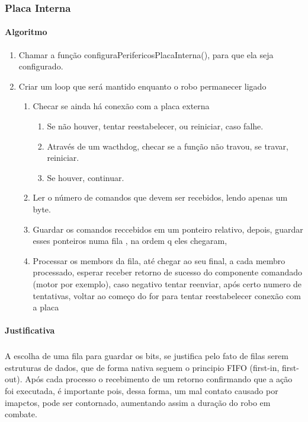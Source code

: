 \documentclass{article}
\begin{document}
            \subsubsection{Placa Interna}
                \paragraph{Algoritmo}
                \begin{enumerate}
                    \item Chamar a função configuraPerifericosPlacaInterna(), para que ela seja configurado.
                    \item Criar um loop que será mantido enquanto o robo permanecer ligado
                    \begin{enumerate}
                        \item Checar se ainda há conexão com a placa externa
                        \begin{enumerate}
                            \item Se não houver, tentar reestabelecer, ou reiniciar, caso falhe.
                            \item Através de um wacthdog, checar se a função não travou, se travar, reiniciar.
                            \item Se houver, continuar.
                        \end{enumerate}
                        \item Ler o número de comandos que devem ser recebidos, lendo apenas um byte.
                        \item Guardar os comandos reccebidos em um ponteiro relativo, depois, guardar esses ponteiros numa fila , na ordem q eles chegaram,
                        \item Processar os membors da fila, até chegar ao seu final, a cada membro processado, esperar receber retorno de sucesso do componente comandado (motor por exemplo), caso negativo tentar reenviar, após certo numero de tentativas, voltar ao começo do for para tentar reestabelecer conexão com a placa
                    \end{enumerate}
                \end{enumerate}

                \paragraph{Justificativa}
                \subparagraph{}
                A escolha de uma fila para guardar os bits, se justifica pelo fato de filas serem estruturas de dados, que de forma nativa seguem o principio FIFO (first-in, first-out). Após cada processo o recebimento de um retorno confirmando que a ação foi executada, é importante pois, dessa forma, um mal contato causado por imapctos, pode ser contornado, aumentando assim a duração do robo em combate.
\end{document}
